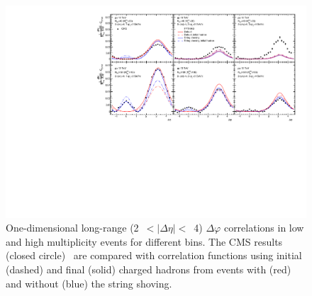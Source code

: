 \begin{figure}[!h]
\includegraphics[width=1.0\textwidth]{figures/dphi_all2.pdf}
\caption{One-dimensional long-range (2~$<|\Delta\eta|<$~4) $\Delta\varphi$ correlations in low and high multiplicity events for different \pt bins. The CMS results (closed circle)~\cite{Khachatryan:2015lva} are compared with correlation functions using initial (dashed) and final (solid) charged hadrons from \pythia events with (red) and without (blue) the string shoving.}
\label{fig:dphi}
\end{figure}
